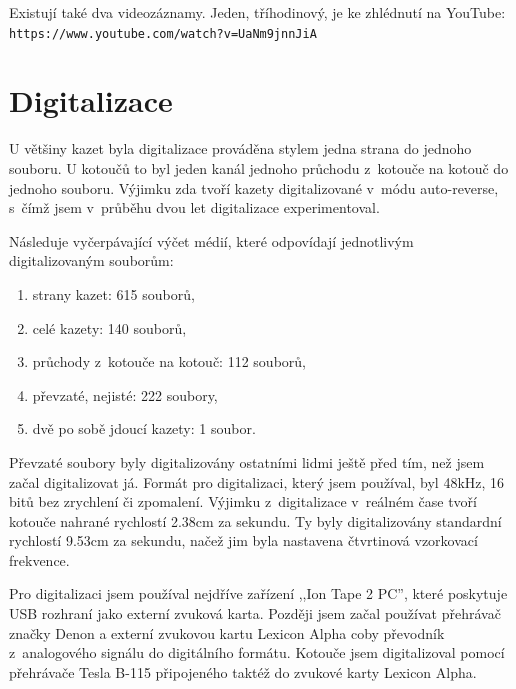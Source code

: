 Existují také dva videozáznamy. Jeden, tříhodinový, je ke zhlédnutí na YouTube:
\texttt{https://www.youtube.com/watch?v=UaNm9jnnJiA}

\section{Digitalizace}

U většiny kazet byla digitalizace prováděna stylem jedna strana do jednoho
souboru. U kotoučů to byl jeden kanál jednoho průchodu z~kotouče na kotouč do
jednoho souboru. Výjimku zda tvoří kazety digitalizované v~módu auto-reverse,
s~čímž jsem v~průběhu dvou let digitalizace experimentoval.

Následuje vyčerpávající výčet médií, které odpovídají jednotlivým
digitalizovaným souborům:

\begin{enumerate}
\item{strany kazet: 615 souborů,}
\item{celé kazety: 140 souborů,}
\item{průchody z~kotouče na kotouč: 112 souborů,}
\item{převzaté, nejisté: 222 soubory,}
\item{dvě po sobě jdoucí kazety: 1 soubor.}
\end{enumerate}

Převzaté soubory byly digitalizovány ostatními lidmi ještě před tím, než jsem
začal digitalizovat já. Formát pro digitalizaci, který jsem používal, byl 48kHz,
16 bitů bez zrychlení či zpomalení. Výjimku z~digitalizace v~reálném čase tvoří
kotouče nahrané rychlostí 2.38cm za sekundu. Ty byly digitalizovány standardní
rychlostí 9.53cm za sekundu, načež jim byla nastavena čtvrtinová vzorkovací
frekvence.

Pro digitalizaci jsem používal nejdříve zařízení ,,Ion Tape 2 PC'', které
poskytuje USB rozhraní jako externí zvuková karta. Později jsem začal používat
přehrávač značky Denon a externí zvukovou kartu Lexicon Alpha coby převodník
z~analogového signálu do digitálního formátu. Kotouče jsem digitalizoval pomocí
přehrávače Tesla B-115 připojeného taktéž do zvukové karty Lexicon Alpha.

